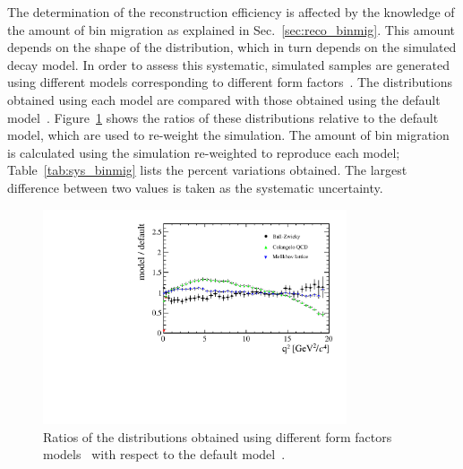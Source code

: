 The determination of the reconstruction efficiency is affected by the knowledge of the
amount of bin migration as explained in Sec.~\ref{sec:reco_binmig}. This amount depends
on the shape of the \qsq distribution, which in turn depends on the simulated \mbox{\BdToKstee} decay model.
In order to assess this systematic, simulated samples are generated using different
models corresponding to different form factors~\cite{Ball:2004ye,Aoki:2013ldr,Melikhov:2000yu}.
The \qsq distributions obtained using each model are compared with those obtained using
the default model~\cite{Ali:1999mm}.
Figure~\ref{fig:q2ratios} shows the ratios of these \qsq distributions relative to the default model, 
which are used to re-weight the simulation. The amount of bin migration is calculated
using the simulation re-weighted to reproduce each model; Table~\ref{tab:sys_binmig} lists the
percent variations obtained. The largest difference between two values is taken as the systematic uncertainty.
\begin{table}[h!]
\centering
\caption{Variation on the level of bin migration (\%) obtained using different form factors models.}
\label{tab:sys_binmig}
\end{table}
%
\begin{figure}[h!]
\centering \includegraphics[width=0.8\textwidth]{RKst/figs/models_ratios.pdf}
\caption{Ratios of the \qsq distributions obtained using different form
factors models~\cite{Ball:2004ye,Aoki:2013ldr,Melikhov:2000yu} with respect 
to the default model~\cite{Ali:1999mm}. }
\label{fig:q2ratios}
\end{figure}
%




